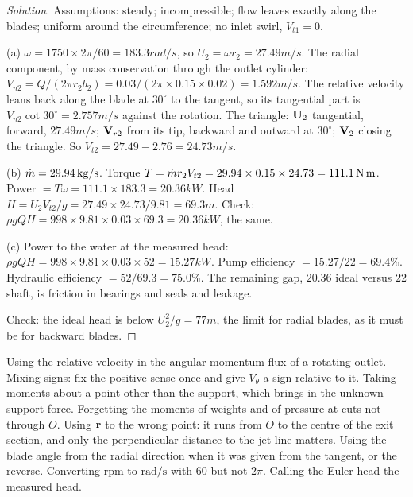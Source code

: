 \begin{proof}[Solution]
Assumptions: steady; incompressible; flow leaves exactly along the blades; uniform around the circumference; no inlet swirl, $V_{t1} = 0$.

(a) $\omega = 1750\times2\pi/60 = 183.3\unit{rad/s}$, so $U_2 = \omega r_2 = 27.49\unit{m/s}$. The radial component, by mass conservation through the outlet cylinder: $V_{n2} = Q/(2\pi r_2b_2) = 0.03/(2\pi\times0.15\times0.02) = 1.592\unit{m/s}$. The relative velocity leans back along the blade at $30^\circ$ to the tangent, so its tangential part is $V_{n2}\cot30^\circ = 2.757\unit{m/s}$ against the rotation. The triangle: $\mathbf{U}_2$ tangential, forward, $27.49\unit{m/s}$; $\mathbf{V}_{r2}$ from its tip, backward and outward at $30^\circ$; $\mathbf{V}_2$ closing the triangle. So $V_{t2} = 27.49 - 2.76 = 24.73\unit{m/s}$.

(b) $\dot m = 29.94\,\mathrm{kg/s}$. Torque $T = \dot m r_2V_{t2} = 29.94\times0.15\times24.73 = 111.1\,\mathrm{N\,m}$. Power $= T\omega = 111.1\times183.3 = 20.36\unit{kW}$. Head $H = U_2V_{t2}/g = 27.49\times24.73/9.81 = 69.3\unit{m}$. Check: $\rho gQH = 998\times9.81\times0.03\times69.3 = 20.36\unit{kW}$, the same.

(c) Power to the water at the measured head: $\rho gQH = 998\times9.81\times0.03\times52 = 15.27\unit{kW}$. Pump efficiency $= 15.27/22 = 69.4\%$. Hydraulic efficiency $= 52/69.3 = 75.0\%$. The remaining gap, $20.36$ ideal versus $22$ shaft, is friction in bearings and seals and leakage.

Check: the ideal head is below $U_2^2/g = 77\unit{m}$, the limit for radial blades, as it must be for backward blades.
\end{proof}

\begin{trap}
Using the relative velocity in the angular momentum flux of a rotating outlet. Mixing signs: fix the positive sense once and give $V_\theta$ a sign relative to it. Taking moments about a point other than the support, which brings in the unknown support force. Forgetting the moments of weights and of pressure at cuts not through $O$. Using $\mathbf{r}$ to the wrong point: it runs from $O$ to the centre of the exit section, and only the perpendicular distance to the jet line matters. Using the blade angle from the radial direction when it was given from the tangent, or the reverse. Converting rpm to $\mathrm{rad/s}$ with $60$ but not $2\pi$. Calling the Euler head the measured head.
\end{trap}

